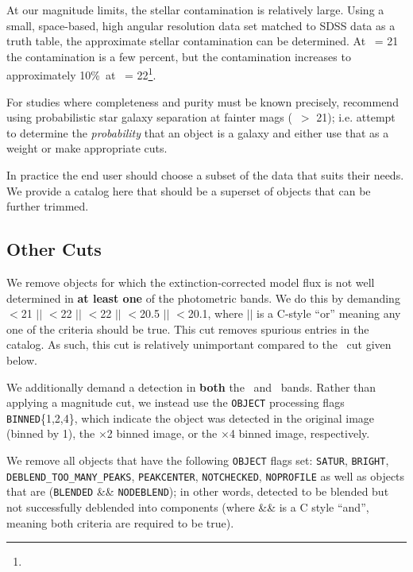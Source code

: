 \documentclass[12pt,preprint]{aastex}
\newcommand{\contamworst}{10\%}
\begin{document}
At our magnitude limits, the stellar contamination is relatively large.  Using
a small, space-based, high angular resolution data set matched to SDSS data as
a truth table, the approximate stellar contamination can be determined.  At
\rmag\ = 21 the contamination is a few percent, but the contamination increases
to approximately \contamworst\ at \rmag\ = 22\footnote{\DRsevsg}.  

For studies where completeness and purity must be known precisely,
\citet{ScrantonMag05} recommend using probabilistic star galaxy separation at
fainter mags (\rmag\ $ > $ 21); i.e.  attempt to determine the {\it
probability} that an object is a galaxy and either use that as a weight or make
appropriate cuts. 


In practice the end user should choose a subset of the data that suits their
needs.  We provide a catalog here that should be a superset of objects that can
be further trimmed.

\subsection{Other Cuts}

We remove objects for which the extinction-corrected \citep{Schlegel98} model
flux is not well determined in {\bf at least one} of the photometric bands.  We
do this by demanding \umag$ < $21 $||$ \gmag$ < $22 $||$ \rmag$ < $22 $||$
\imag$ < $20.5 $||$ \zmag$ < $20.1, where $||$ is a C-style ``or'' meaning any
one of the criteria should be true. This cut removes spurious entries in the
catalog.  As such, this cut is relatively unimportant compared to the \rmag\
cut given below.

We additionally demand a detection in {\bf both} the \rmag\ and \imag\ bands.
Rather than applying a magnitude cut, we instead use the \texttt{OBJECT}
processing flags \texttt{BINNED}\{1,2,4\}, which indicate the object was
detected in the original image (binned by 1), the $\times$2 binned image, or
the $\times$4 binned image, respectively\citep{Stough02}.

\begin{sloppypar}
We remove all objects that have the following \texttt{OBJECT} flags set:
\texttt{SATUR}, \texttt{BRIGHT}, \texttt{DEBLEND\_TOO\_MANY\_PEAKS},
\texttt{PEAKCENTER}, \texttt{NOTCHECKED}, \texttt{NOPROFILE} as well as objects
that are (\texttt{BLENDED} \&\& \texttt{NODEBLEND}); in other words, detected
to be blended but not successfully deblended into components (where \&\& is
a C style ``and'', meaning both criteria are required to be true). 
\end{sloppypar}
\end{document}
